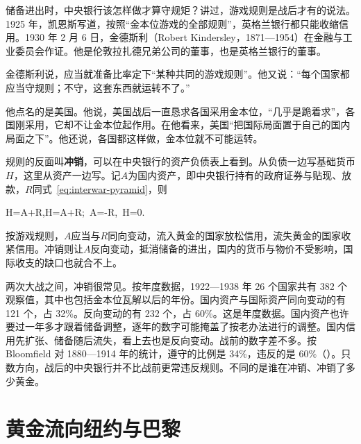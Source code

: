 储备进出时，中央银行该怎样做才算守规矩？讲过，游戏规则是战后才有的说法。1925 年，凯恩斯写道，按照“金本位游戏的全部规则”，英格兰银行都只能收缩信用\cite{keynes1925}。1930 年 2 月 6 日，金德斯利（Robert Kindersley，1871—1954）在金融与工业委员会作证\cite{bnf27,macmillan1931}。他是伦敦拉扎德兄弟公司的董事，也是英格兰银行的董事\cite{macmillan1931,dutton1984}。

金德斯利说，应当就准备比率定下“某种共同的游戏规则”。他又说：“每个国家都应当守规则；不守，这套东西就运转不了。”\cite{macmillan1931}

他点名的是美国。他说，美国战后一直恳求各国采用金本位，“几乎是跪着求”，各国刚采用，它却不让金本位起作用\cite{macmillan1931}。在他看来，美国“把国际局面置于自己的国内局面之下”。他还说，各国都这样做，金本位就不可能运转\cite{macmillan1931}。

规则的反面叫\textbf{冲销}，可以在中央银行的资产负债表上看到。从负债一边写基础货币$H$，这里从资产一边写。记$A$为国内资产，即中央银行持有的政府证券与贴现、放款，$R$同式~\eqref{eq:interwar-pyramid}，则
\begin{keyeq}
H=A+R,\qquad \Delta H=\Delta A+\Delta R;\qquad {}\ \Delta A=-\Delta R,\ \Delta H=0.\label{eq:interwar-sterilize}
\end{keyeq}
按游戏规则，$A$应当与$R$同向变动，流入黄金的国家放松信用，流失黄金的国家收紧信用。冲销则让$A$反向变动，抵消储备的进出，国内的货币与物价不受影响，国际收支的缺口也就合不上。

两次大战之间，冲销很常见。按年度数据，1922—1938 年 26 个国家共有 382 个观察值，其中也包括金本位瓦解以后的年份。国内资产与国际资产同向变动的有 121 个，占 32\%\cite{nurkse1944}。反向变动的有 232 个，占 60\%\cite{nurkse1944}。这是年度数据。国内资产也许要过一年多才跟着储备调整，逐年的数字可能掩盖了按老办法进行的调整。国内信用先扩张、储备随后流失，看上去也是反向变动\cite{nurkse1944}。战前的数字差不多。按 Bloomfield 对 1880—1914 年的统计，遵守的比例是 34\%，违反的是 60\%（）\cite{bloomfield1959,dutton1984}。只数方向，战后的中央银行并不比战前更常违反规则。不同的是谁在冲销、冲销了多少黄金。

\section{黄金流向纽约与巴黎}\label{sec:interwar-gold}

